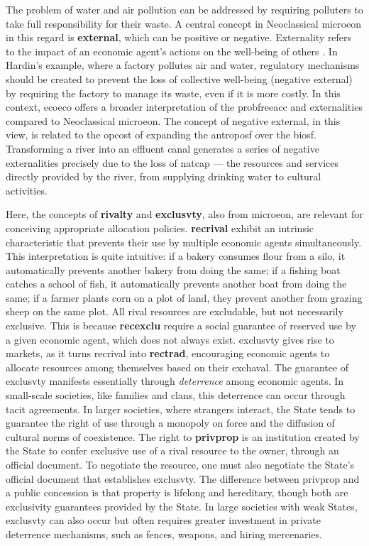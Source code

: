 \documentclass[./main_en.tex]{subfiles}
\begin{document}
\noindent The problem of water and air pollution can be addressed by requiring polluters to take full responsibility for their waste. A central concept in Neoclassical \gls{microeon} in this regard is \textbf{\gls{external}}, which can be positive or negative. Externality refers to the impact of an economic agent's actions on the well-being of others \cite{Mankiw2002a}. In Hardin's example, where a factory pollutes air and water, regulatory mechanisms should be created to prevent the loss of collective well-being (negative \gls{external}) by requiring the factory to manage its waste, even if it is more costly. In this context, \gls{ecoeco} offers a broader interpretation of the \gls{probfreeacc} and externalities compared to Neoclassical \gls{microeon}. The concept of negative \gls{external}, in this view, is related to the \gls{opcost} of expanding the \gls{antroposf} over the \gls{biosf}. Transforming a river into an effluent canal generates a series of negative externalities precisely due to the loss of \gls{natcap} — the resources and services directly provided by the river, from supplying drinking water to cultural activities.

\par Here, the concepts of \textbf{\gls{rivalty}} and \textbf{\gls{exclusvty}}, also from \gls{microeon}, are relevant for conceiving appropriate allocation policies. \textbf{\gls{recrival}} exhibit an intrinsic characteristic that prevents their use by multiple economic agents simultaneously. This interpretation is quite intuitive: if a bakery consumes flour from a silo, it automatically prevents another bakery from doing the same; if a fishing boat catches a school of fish, it automatically prevents another boat from doing the same; if a farmer plants corn on a plot of land, they prevent another from grazing sheep on the same plot. All rival resources are excludable, but not necessarily exclusive. This is because \textbf{\gls{recexclu}} require a social guarantee of reserved use by a given economic agent, which does not always exist. \gls{exclusvty} gives rise to markets, as it turns \gls{recrival} into \textbf{\gls{rectrad}}, encouraging economic agents to allocate resources among themselves based on their \gls{exchaval}. The guarantee of \gls{exclusvty} manifests essentially through \textit{deterrence} among economic agents. In small-scale societies, like families and clans, this deterrence can occur through tacit agreements. In larger societies, where strangers interact, the State tends to guarantee the right of use through a monopoly on force and the diffusion of cultural norms of coexistence. The right to \textbf{\gls{privprop}} is an institution created by the State to confer exclusive use of a rival resource to the owner, through an official document. To negotiate the resource, one must also negotiate the State’s official document that establishes \gls{exclusvty}. The difference between \gls{privprop} and a public concession is that property is lifelong and hereditary, though both are exclusivity guarantees provided by the State. In large societies with weak States, \gls{exclusvty} can also occur but often requires greater investment in private deterrence mechanisms, such as fences, weapons, and hiring mercenaries.
\end{document}
